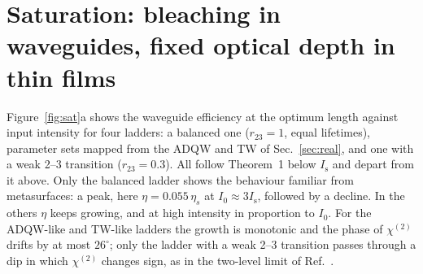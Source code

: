 \documentclass[11pt]{article}
\newcommand{\chitwo}{\chi^{(2)}}
\newcommand{\Is}{I_\mathrm{s}}
\begin{document}
\section{Saturation: bleaching in waveguides, fixed optical depth in thin films}\label{sec:sat}
Figure~\ref{fig:sat}a shows the waveguide efficiency at the optimum length against input intensity for four ladders: a balanced one ($r_{23}=1$, equal lifetimes), parameter sets mapped from the ADQW and TW of Sec.~\ref{sec:real}, and one with a weak 2--3 transition ($r_{23}=0.3$). All follow Theorem~1 below $\Is$ and depart from it above. Only the balanced ladder shows the behaviour familiar from metasurfaces: a peak, here $\eta=0.055\,\eta_s$ at $I_0\approx3\Is$, followed by a decline. In the others $\eta$ keeps growing, and at high intensity in proportion to $I_0$. For the ADQW-like and TW-like ladders the growth is monotonic and the phase of $\chitwo$ drifts by at most $26^\circ$; only the ladder with a weak 2--3 transition passes through a dip in which $\chitwo$ changes sign, as in the two-level limit of Ref.~\cite{GomezDiaz2015}.
\end{document}
